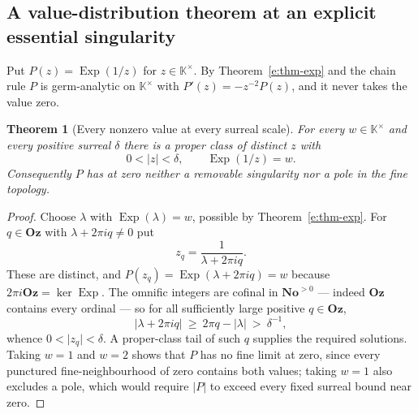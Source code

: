 \documentclass[11pt,a4paper]{article}
\numberwithin{equation}{section}
\newtheorem{theorem}{Theorem}[section]
\theoremstyle{definition}
\theoremstyle{remark}
\theoremstyle{plain}
\newcommand{\K}{\mathbb K}
\newcommand{\No}{\mathbf{No}}
\newcommand{\Oz}{\mathbf{Oz}}
\DeclareMathOperator{\Exp}{Exp}
\newcommand{\abs}[1]{\lvert #1\rvert}
\begin{document}
\subsection{A value-distribution theorem at an explicit essential
singularity}\label{e:sec-picard}

Put $P(z)=\Exp(1/z)$ for $z\in\K^{\times}$.  By
Theorem~\ref{e:thm-exp} and the chain rule $P$ is germ-analytic on
$\K^{\times}$ with $P'(z)=-z^{-2}P(z)$, and it never takes the value zero.

\begin{theorem}[Every nonzero value at every surreal scale]
\label{e:thm-picard}
For every $w\in\K^{\times}$ and every positive surreal $\delta$ there is a
\emph{proper class} of distinct $z$ with
\[
 0<\abs z<\delta,\qquad \Exp(1/z)=w .
\]
Consequently $P$ has at zero neither a removable singularity nor a pole in
the fine topology.
\end{theorem}

\begin{proof}
Choose $\lambda$ with $\Exp(\lambda)=w$, possible by
Theorem~\ref{e:thm-exp}.  For $q\in\Oz$ with $\lambda+2\pi iq\ne0$ put
\[
 z_q=\frac1{\lambda+2\pi iq} .
\]
These are distinct, and $P(z_q)=\Exp(\lambda+2\pi iq)=w$ because
$2\pi i\Oz=\ker\Exp$.  The omnific integers are cofinal in $\No^{>0}$ ---
indeed $\Oz$ contains every ordinal --- so for all sufficiently large
positive $q\in\Oz$,
\[
 \abs{\lambda+2\pi iq}\ \ge\ 2\pi q-\abs\lambda\ >\ \delta^{-1},
\]
whence $0<\abs{z_q}<\delta$.  A proper-class tail of such $q$ supplies the
required solutions.  Taking $w=1$ and $w=2$ shows that $P$ has no fine
limit at zero, since every punctured fine-neighbourhood of zero contains
both values; taking $w=1$ also excludes a pole, which would require
$\abs P$ to exceed every fixed surreal bound near zero.
\end{proof}
\end{document}

